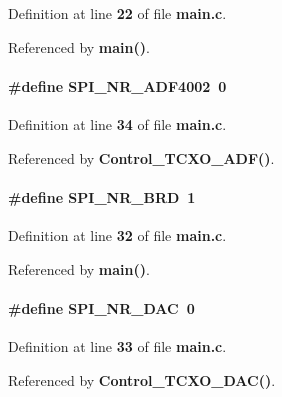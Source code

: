 Definition at line {\bf 22} of file {\bf main.\+c}.



Referenced by {\bf main()}.

\paragraph[{S\+P\+I\+\_\+\+N\+R\+\_\+\+A\+D\+F4002}]{\setlength{\rightskip}{0pt plus 5cm}\#define S\+P\+I\+\_\+\+N\+R\+\_\+\+A\+D\+F4002~0}\label{main_8c_ade5b2d5349fa2d082dc34355c0b56cf6}


Definition at line {\bf 34} of file {\bf main.\+c}.



Referenced by {\bf Control\+\_\+\+T\+C\+X\+O\+\_\+\+A\+D\+F()}.

\paragraph[{S\+P\+I\+\_\+\+N\+R\+\_\+\+B\+RD}]{\setlength{\rightskip}{0pt plus 5cm}\#define S\+P\+I\+\_\+\+N\+R\+\_\+\+B\+RD~1}\label{main_8c_a0c4f25c401a2d9dcc4aac11bd4ac7ff2}


Definition at line {\bf 32} of file {\bf main.\+c}.



Referenced by {\bf main()}.

\paragraph[{S\+P\+I\+\_\+\+N\+R\+\_\+\+D\+AC}]{\setlength{\rightskip}{0pt plus 5cm}\#define S\+P\+I\+\_\+\+N\+R\+\_\+\+D\+AC~0}\label{main_8c_a604fd38961021cbd3b71587615ac369d}


Definition at line {\bf 33} of file {\bf main.\+c}.



Referenced by {\bf Control\+\_\+\+T\+C\+X\+O\+\_\+\+D\+A\+C()}.

